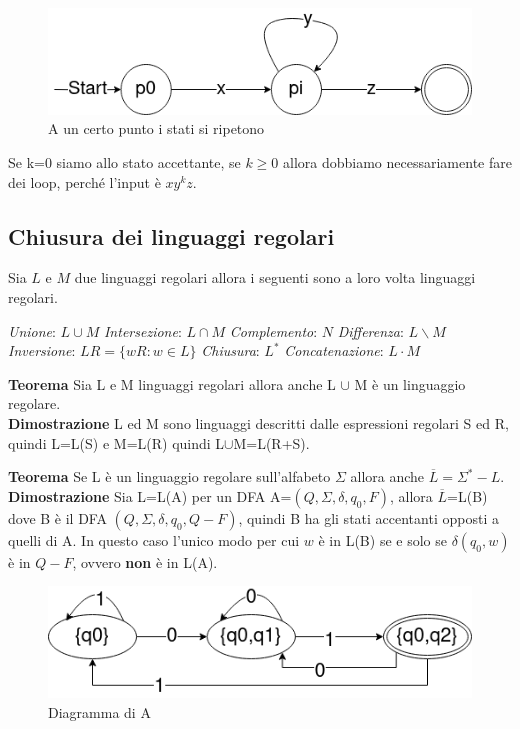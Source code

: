 \documentclass[12pt]{article}
\begin{document}
	\begin{figure}[ht]
		\includegraphics[scale = 0.5]{media/pump.png}
		\centering
		\caption{A un certo punto i stati si ripetono}
	\end{figure}

	Se k=0 siamo allo stato accettante, se $k \geq 0$ allora dobbiamo necessariamente fare dei loop, perché l'input è $xy^kz$.

	\newpage
	\subsection{Chiusura dei linguaggi regolari}
	Sia $L$ e $M$ due linguaggi regolari allora i seguenti sono a loro volta linguaggi regolari.
	\begin{outline}
		\1 \emph{Unione}: $L \cup M$
		\1 \emph{Intersezione}: $L \cap M$
		\1 \emph{Complemento}: $N$
		\1 \emph{Differenza}: $L \backslash M$
		\1 \emph{Inversione}: $LR = \{wR : w \in L\}$
		\1 \emph{Chiusura}: $L^*$
		\1 \emph{Concatenazione}: $L\cdot M$
	\end{outline}

	\textbf{Teorema} Sia L e M linguaggi regolari allora anche L $\cup$ M è un linguaggio regolare.
	\\ \textbf{Dimostrazione} L ed M sono linguaggi descritti dalle espressioni regolari S ed R, quindi L=L(S) e M=L(R) quindi L$\cup$M=L(R+S).
  \vspace{5mm}

\textbf{Teorema} Se L è un linguaggio regolare sull'alfabeto $\Sigma$ allora anche $\overline{L}=\Sigma^*-L$.
\\ \textbf{Dimostrazione} Sia L=L(A) per un DFA A=$(Q,\Sigma,\delta,q_0,F)$, allora $\overline{L}$=L(B) dove B è il DFA $(Q,\Sigma,\delta,q_0,Q-F)$, quindi B ha gli stati accentanti opposti a quelli di A. In questo caso l'unico modo per cui $w$ è in L(B) se e solo se $\delta(q_0,w)$ è in $Q-F$, ovvero \textbf{non} è in L(A).

\begin{figure}[ht]
  \includegraphics[scale = 0.5]{media/prop1.png}
  \centering
  \caption{Diagramma di A}
\end{figure}
\end{document}
